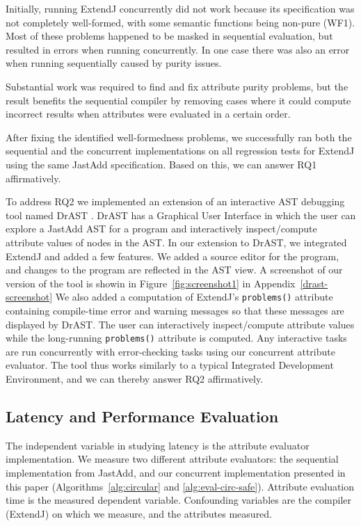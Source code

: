{Initially, running ExtendJ concurrently did not work because its specification was
not completely well-formed, with some semantic functions being non-pure (WF1).
Most of these problems happened to be masked in sequential evaluation,
but resulted in errors when running concurrently.
In one case there was also
an error when running sequentially caused by purity issues.

Substantial work was required to find and fix attribute purity problems, but the result benefits the
sequential compiler by removing cases where it could compute incorrect results when attributes were
evaluated in a certain order.

After fixing the identified well-formedness problems, we successfully ran both the sequential and
the concurrent implementations on all regression tests for ExtendJ using the same JastAdd
specification.  Based on this, we can answer RQ1 affirmatively.

To address RQ2 we
implemented an extension of 
an interactive AST debugging tool named DrAST \cite{Lindholm:2016:DIT:2997364.2997378}.  DrAST has a
Graphical User Interface in which the user can explore a JastAdd AST for a program and interactively
inspect/compute attribute values of nodes in the AST.  In our extension to DrAST, we integrated
ExtendJ and added a few features.
We added a source editor for the program, and changes to the program are
reflected in the AST view.
A screenshot of our version of the tool is showin in Figure~\ref{fig:screenshot1} in Appendix~\ref{drast-screenshot}
We also added a computation of ExtendJ's \texttt{problems()} attribute
containing compile-time error and warning messages so that these messages are displayed by DrAST.
The user can interactively inspect/compute attribute values while the long-running
\texttt{problems()} attribute is computed. Any interactive tasks are run concurrently with
error-checking tasks using our concurrent attribute evaluator.
The tool thus works similarly to a typical Integrated
Development Environment, and we can thereby answer RQ2 affirmatively.


\subsection{Latency and Performance Evaluation}
\label{latency-and-performance}

The independent variable in studying latency is the attribute evaluator implementation.
We measure two different attribute evaluators: the sequential
implementation from JastAdd, and our concurrent implementation presented
in this paper (Algorithms~\ref{alg:circular} and \ref{alg:eval-circ-safe}).
%
Attribute evaluation time is the measured dependent variable.
%
Confounding variables are the compiler (ExtendJ) on which we measure,
and the attributes measured.

}
